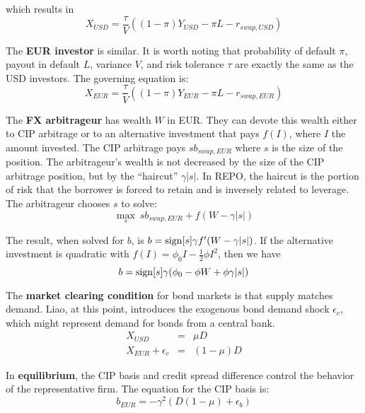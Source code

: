 \noindent which results in 
\begin{equation}
  X_{USD} = \frac{\tau}{V}((1-\pi)Y_{USD} - \pi L - r_{swap,USD})
\end{equation}

The \textbf{EUR investor} is similar.  It is worth noting that probability of default $\pi$, payout in default $L$, variance $V$, and risk tolerance $\tau$ are exactly the same as the USD investors.  The governing equation is: 
\begin{equation}
  X_{EUR} = \frac{\tau}{V}((1-\pi)Y_{EUR} - \pi L - r_{swap,EUR})
\end{equation}


The \textbf{FX arbitrageur} has wealth $W$ in EUR.  They can devote this wealth either to CIP arbitrage or to an alternative investment that pays $f(I)$, where $I$ the amount invested.  The CIP arbitrage pays $sb_{swap, EUR}$ where $s$ is the size of the position.  The arbitrageur's wealth is not decreased by the size of the CIP arbitrage position, but by the ``haircut'' $\gamma |s|$.  In REPO, the haircut is the portion of risk that the borrower is forced to retain and is inversely related to leverage.  The arbitrageur chooses $s$ to solve:
\begin{equation}
  \max_s \ sb_{swap,EUR}  + f(W - \gamma |s|)
\end{equation}

The result, when solved for $b$, is $b = \operatorname{sign}[s] \gamma f'(W-\gamma |s| )$.  If the alternative investment is quadratic with $f(I) = \phi_0I - \frac{1}{2} \phi I^2$, then we have
\begin{equation}
  b = \operatorname{sign}[s]\gamma(\phi_0 - \phi W + \phi \gamma |s|)
\end{equation}



The \textbf{market clearing condition} for bond markets is that supply matches demand.  Liao, at this point, introduces the exogenous bond demand shock $\epsilon_c$, which might represent demand for bonds from a central bank.
\begin{align}
    X_{USD} & = & \mu D \\
    X_{EUR} + \epsilon_c & = & (1-\mu) D 
\end{align}



In \textbf{equilibrium}, the CIP basis and credit spread difference control the behavior of the representative firm.  The equation for the CIP basis is:
\begin{equation}
   b_{EUR} = -\gamma^2 (D(1-\mu) + \epsilon_b)
\end{equation}

